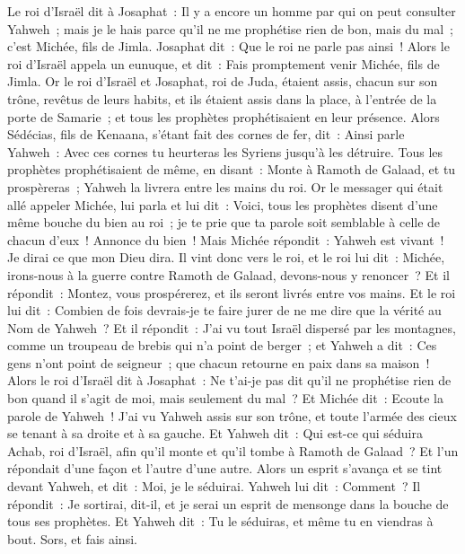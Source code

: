 \begin{multicols}{2}
Le roi d'Israël dit à Josaphat~: Il y a encore un homme par qui on peut consulter Yahweh~; mais je le hais parce qu'il ne me prophétise rien de bon, mais du mal~; c'est Michée, fils de Jimla. Josaphat dit~: Que le roi ne parle pas ainsi~!
Alors le roi d'Israël appela un eunuque, et dit~: Fais promptement venir Michée, fils de Jimla.
Or le roi d'Israël et Josaphat, roi de Juda, étaient assis, chacun sur son trône, revêtus de leurs habits, et ils étaient assis dans la place, à l'entrée de la porte de Samarie~; et tous les prophètes prophétisaient en leur présence.
Alors Sédécias, fils de Kenaana, s'étant fait des cornes de fer, dit~: Ainsi parle Yahweh~: Avec ces cornes tu heurteras les Syriens jusqu'à les détruire.
Tous les prophètes prophétisaient de même, en disant~: Monte à Ramoth de Galaad, et tu prospèreras~; Yahweh la livrera entre les mains du roi.
Or le messager qui était allé appeler Michée, lui parla et lui dit~: Voici, tous les prophètes disent d'une même bouche du bien au roi~; je te prie que ta parole soit semblable à celle de chacun d'eux~! Annonce du bien~!
Mais Michée répondit~: Yahweh est vivant~! Je dirai ce que mon Dieu dira.
Il vint donc vers le roi, et le roi lui dit~: Michée, irons-nous à la guerre contre Ramoth de Galaad, devons-nous y renoncer~? Et il répondit~: Montez, vous prospérerez, et ils seront livrés entre vos mains.
Et le roi lui dit~: Combien de fois devrais-je te faire jurer de ne me dire que la vérité au Nom de Yahweh~?
Et il répondit~: J'ai vu tout Israël dispersé par les montagnes, comme un troupeau de brebis qui n'a point de berger~; et Yahweh a dit~: Ces gens n'ont point de seigneur~; que chacun retourne en paix dans sa maison~!
Alors le roi d'Israël dit à Josaphat~: Ne t'ai-je pas dit qu'il ne prophétise rien de bon quand il s'agit de moi, mais seulement du mal~?
Et Michée dit~: Ecoute la parole de Yahweh~! J'ai vu Yahweh assis sur son trône, et toute l'armée des cieux se tenant à sa droite et à sa gauche.
Et Yahweh dit~: Qui est-ce qui séduira Achab, roi d'Israël, afin qu'il monte et qu'il tombe à Ramoth de Galaad~? Et l'un répondait d'une façon et l'autre d'une autre.
Alors un esprit s'avança et se tint devant Yahweh, et dit~: Moi, je le séduirai. Yahweh lui dit~: Comment~?
Il répondit~: Je sortirai, dit-il, et je serai un esprit de mensonge dans la bouche de tous ses prophètes. Et Yahweh dit~: Tu le séduiras, et même tu en viendras à bout. Sors, et fais ainsi.

\end{multicols}
